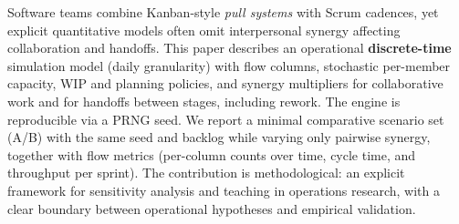 Software teams combine Kanban-style \emph{pull systems} with Scrum cadences, yet explicit quantitative models often omit interpersonal synergy affecting collaboration and handoffs. This paper describes an operational \textbf{discrete-time} simulation model (daily granularity) with flow columns, stochastic per-member capacity, WIP and planning policies, and synergy multipliers for collaborative work and for handoffs between stages, including rework. The engine is reproducible via a PRNG seed. We report a minimal comparative scenario set (A/B) with the same seed and backlog while varying only pairwise synergy, together with flow metrics (per-column counts over time, cycle time, and throughput per sprint). The contribution is methodological: an explicit framework for sensitivity analysis and teaching in operations research, with a clear boundary between operational hypotheses and empirical validation.
